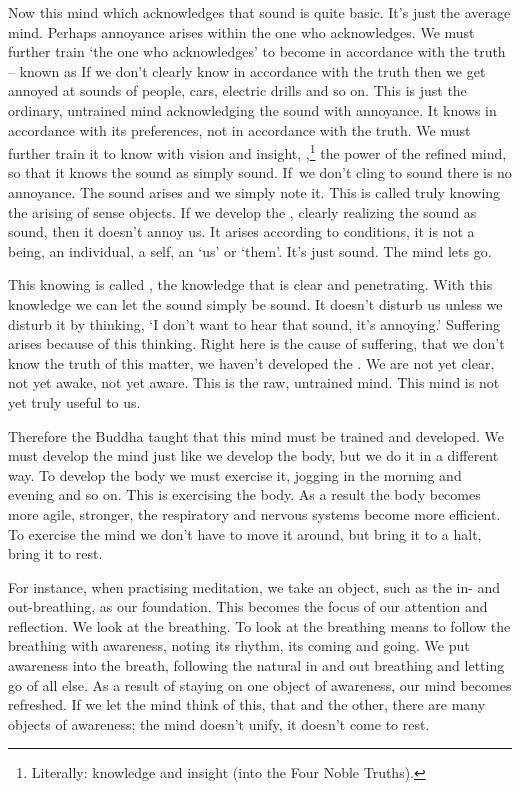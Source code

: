 Now this mind which acknowledges that sound is quite basic. It's just the average mind. Perhaps annoyance arises within the one who acknowledges. We must further train `the one who acknowledges' to become  in accordance with the truth -- known as  If we don't clearly know in accordance with the truth then we get annoyed at sounds of people, cars, electric drills and so on. This is just the ordinary, untrained mind acknowledging the sound with annoyance. It knows in accordance with its preferences, not in accordance with the truth. We must further train it to know with vision and insight, ,\footnote{Literally: knowledge and insight (into the Four Noble Truths).} the power of the refined mind, so that it knows the sound as simply sound. If~we don't cling to sound there is no annoyance. The sound arises and we simply note it. This is called truly knowing the arising of sense objects. If we develop the , clearly realizing the sound as sound, then it doesn't annoy us. It arises according to conditions, it is not a being, an individual, a self, an `us' or `them'. It's just sound. The mind lets go.

This knowing is called , the knowledge that is clear and penetrating. With this knowledge we can let the sound simply be sound. It doesn't disturb us unless we disturb it by thinking, `I don't want to hear that sound, it's annoying.' Suffering arises because of this thinking. Right here is the cause of suffering, that we don't know the truth of this matter, we haven't developed the . We are not yet clear, not yet awake, not yet aware. This is the raw, untrained mind. This mind is not yet truly useful to us.

Therefore the Buddha taught that this mind must be trained and developed. We must develop the mind just like we develop the body, but we do it in a different way. To develop the body we must exercise it, jogging in the morning and evening and so on. This is exercising the body. As a result the body becomes more agile, stronger, the respiratory and nervous systems become more efficient. To exercise the mind we don't have to move it around, but bring it to a halt, bring it to rest.

For instance, when practising meditation, we take an object, such as the in- and out-breathing, as our foundation. This becomes the focus of our attention and reflection. We look at the breathing. To look at the breathing means to follow the breathing with awareness, noting its rhythm, its coming and going. We put awareness into the breath, following the natural in and out breathing and letting go of all else. As a result of staying on one object of awareness, our mind becomes refreshed. If we let the mind think of this, that and the other, there are many objects of awareness; the mind doesn't unify, it doesn't come to rest.

